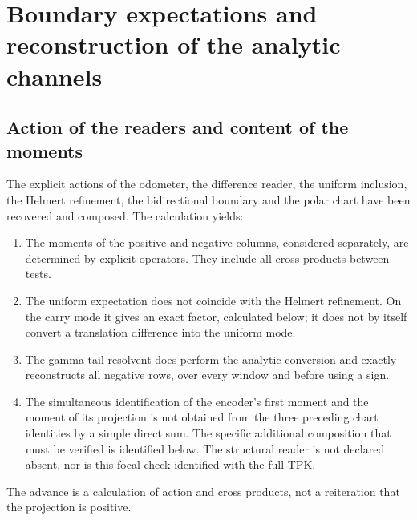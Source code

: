 \clearpage
\section[Boundary expectations and reconstruction of the analytic channels]{Boundary expectations and\\reconstruction of the analytic channels}
\label{viii:sec:lectores-gamma}


\subsection{Action of the readers and content of the moments}
\label{viii:gamma-add-sub-5}

The explicit actions of the odometer, the difference reader, the uniform inclusion, the Helmert refinement, the bidirectional boundary and the polar chart have been recovered and composed. The calculation yields:

\begin{enumerate}
\item The moments of the positive and negative columns, considered separately, are determined by explicit operators. They include all cross products between tests.
\item The uniform expectation does not coincide with the Helmert refinement. On the carry mode it gives an exact factor, calculated below; it does not by itself convert a translation difference into the uniform mode.
\item The gamma-tail resolvent does perform the analytic conversion and exactly reconstructs all negative rows, over every window and before using a sign.
\item The simultaneous identification of the encoder's first moment and the moment of its projection is not obtained from the three preceding chart identities by a simple direct sum. The specific additional composition that must be verified is identified below. The structural reader is not declared absent, nor is this focal check identified with the full TPK.

\end{enumerate}
The advance is a calculation of action and cross products, not a reiteration that the projection is positive.


